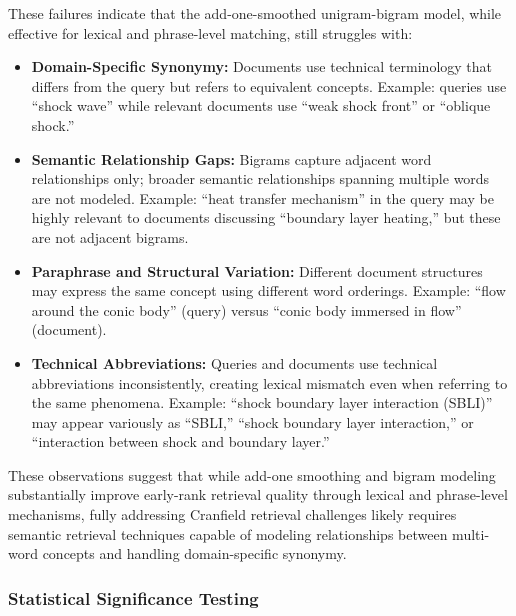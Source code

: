 These failures indicate that the add-one-smoothed unigram-bigram model, while effective for lexical and phrase-level matching, still struggles with:

\begin{itemize}
    \item \textbf{Domain-Specific Synonymy:}
    Documents use technical terminology that differs from the query but refers to equivalent concepts.
    Example: queries use ``shock wave'' while relevant documents use ``weak shock front'' or ``oblique shock.''
    
    \item \textbf{Semantic Relationship Gaps:}
    Bigrams capture adjacent word relationships only; broader semantic relationships spanning multiple words are not modeled.
    Example: ``heat transfer mechanism'' in the query may be highly relevant to documents discussing ``boundary layer heating,'' but these are not adjacent bigrams.
    
    \item \textbf{Paraphrase and Structural Variation:}
    Different document structures may express the same concept using different word orderings.
    Example: ``flow around the conic body'' (query) versus ``conic body immersed in flow'' (document).
    
    \item \textbf{Technical Abbreviations:}
    Queries and documents use technical abbreviations inconsistently, creating lexical mismatch even when referring to the same phenomena.
    Example: ``shock boundary layer interaction (SBLI)'' may appear variously as ``SBLI,'' ``shock boundary layer interaction,'' or ``interaction between shock and boundary layer.''
\end{itemize}

These observations suggest that while add-one smoothing and bigram modeling substantially improve early-rank retrieval quality through lexical and phrase-level mechanisms, fully addressing Cranfield retrieval challenges likely requires semantic retrieval techniques capable of modeling relationships between multi-word concepts and handling domain-specific synonymy.

\vspace{0.2cm}

\subsubsection{Statistical Significance Testing}

